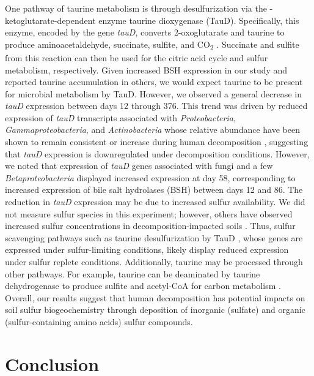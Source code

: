 \documentclass[
  sn-nature,
  lineno, referee]{sn-jnl}
\begin{document}
One pathway of taurine metabolism is through desulfurization via the
\textalpha-ketoglutarate-dependent enzyme taurine dioxygenase (TauD).
Specifically, this enzyme, encoded by the gene \emph{tauD}, converts
2-oxoglutarate and taurine to produce aminoacetaldehyde, succinate,
sulfite, and CO\textsubscript{2} \citep{cook_metabolism_2006}. Succinate
and sulfite from this reaction can then be used for the citric acid
cycle and sulfur metabolism, respectively. Given increased BSH
expression in our study and reported taurine accumulation in others, we
would expect taurine to be present for microbial metabolism by TauD.
However, we observed a general decrease in \emph{tauD} expression
between days 12 through 376. This trend was driven by reduced expression
of \emph{tauD} transcripts associated with \emph{Proteobacteria},
\emph{Gammaproteobacteria}, and \emph{Actinobacteria} whose relative
abundance have been shown to remain consistent or increase during human
decomposition \citep{cobaugh_functional_2015}, suggesting that
\emph{tauD} expression is downregulated under decomposition conditions.
However, we noted that expression of \emph{tauD} genes associated with
fungi and a few \emph{Betaproteobacteria} displayed increased expression
at day 58, corresponding to increased expression of bile salt hydrolases
(BSH) between days 12 and 86. The reduction in \emph{tauD} expression
may be due to increased sulfur availability. We did not measure sulfur
species in this experiment; however, others have observed increased
sulfur concentrations in decomposition-impacted soils
\citep{aitkenhead-peterson_mapping_2012, taylor_soil_2023, debruyn_carrion_2024}.
Thus, sulfur scavenging pathways such as taurine desulfurization by TauD
\citep{kertesz_riding_2000}, whose genes are expressed under
sulfur-limiting conditions, likely display reduced expression under
sulfur replete conditions. Additionally, taurine may be processed
through other pathways. For example, taurine can be deaminated by
taurine dehydrogenase to produce sulfite and acetyl-CoA for carbon
metabolism \citep{cook_metabolism_2006, bruggemann_enzymes_2004}.
Overall, our results suggest that human decomposition has potential
impacts on soil sulfur biogeochemistry through deposition of inorganic
(sulfate) and organic (sulfur-containing amino acids) sulfur compounds.

\section{Conclusion}\label{conclusion}
\end{document}

